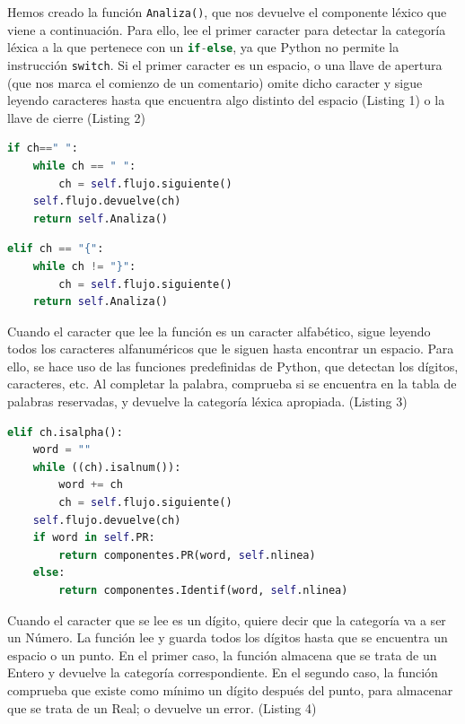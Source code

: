 \documentclass[11pt]{article}
\begin{document}
Hemos creado la función \lstinline[language=Python]{Analiza()}, que nos devuelve el componente léxico que viene a continuación. Para ello, lee el primer caracter para detectar la categoría léxica a la que pertenece con un \lstinline[language=Python]{if-else}, ya que Python no permite la instrucción \lstinline[language=Python]{switch}. Si el primer caracter es un espacio, o una llave de apertura (que nos marca el comienzo de un comentario) omite dicho caracter y sigue leyendo caracteres hasta que encuentra algo distinto del espacio (Listing 1) o la llave de cierre (Listing 2)

\begin{lstlisting}[language=Python, caption=Omisión de espacios]
	if ch==" ":
    while ch == " ":
    	ch = self.flujo.siguiente()
    self.flujo.devuelve(ch)
    return self.Analiza()
\end{lstlisting}

\begin{lstlisting}[language=Python, caption=Tratamiento de comentarios]
	elif ch == "{":
    while ch != "}":
    	ch = self.flujo.siguiente()
    return self.Analiza()
\end{lstlisting}

Cuando el caracter que lee la función es un caracter alfabético, sigue leyendo todos los caracteres alfanuméricos que le siguen hasta encontrar un espacio. Para ello, se hace uso de las funciones predefinidas de Python, que detectan los dígitos, caracteres, etc. Al completar la palabra, comprueba si se encuentra en la tabla de palabras reservadas, y devuelve la categoría léxica apropiada. (Listing 3)

\begin{lstlisting}[language=Python, caption=Detección de palabras]
	elif ch.isalpha():
    word = ""
    while ((ch).isalnum()):
    	word += ch
    	ch = self.flujo.siguiente()
    self.flujo.devuelve(ch)
    if word in self.PR:
    	return componentes.PR(word, self.nlinea)
    else:
    	return componentes.Identif(word, self.nlinea)
\end{lstlisting}

Cuando el caracter que se lee es un dígito, quiere decir que la categoría va a ser un Número. La función lee y guarda todos los dígitos hasta que se encuentra un espacio o un punto. En el primer caso, la función almacena que se trata de un Entero y devuelve la categoría correspondiente. En el segundo caso, la función comprueba que existe como mínimo un dígito después del punto, para almacenar que se trata de un Real; o devuelve un error. (Listing 4) 
\end{document}
